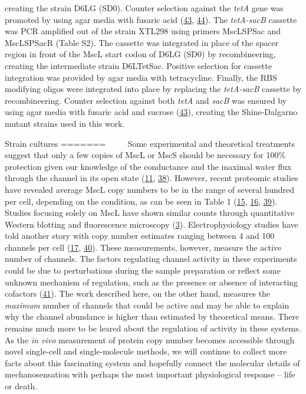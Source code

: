 creating
the
strain
D6LG
(SD0).
Counter
selection
against
the
\emph{tetA}
gene
was
promoted
by
using
agar
media
with
fusaric
acid
(\protect\hyperlink{ref-li2013}{43},
\protect\hyperlink{ref-bochner1980}{44}).
The
\emph{tetA-sacB}
cassette
was
PCR
amplified
out of
the
strain
XTL298
using
primers
MscLSPSac
and
MscLSPSacR
(Table
S2).
The
cassette
was
integrated
in
place
of the
spacer
region
in
front
of the
MscL
start
codon
of
D6LG
(SD0)
by
recombineering,
creating
the
intermediate
strain
D6LTetSac.
Positive
selection
for
cassette
integration
was
provided
by
agar
media
with
tetracycline.
Finally,
the
RBS
modifying
oligos
were
integrated
into
place
by
replacing
the
\emph{tetA-sacB}
cassette
by
recombineering.
Counter
selection
against
both
\emph{tetA}
and
\emph{sacB}
was
ensured
by
using
agar
media
with
fusaric
acid
and
sucrose
(\protect\hyperlink{ref-li2013}{43}),
creating
the
Shine-Dalgarno
mutant
strains
used
in
this
work.

Strain
cultures
=======
~~~~
Some
experimental
and
theoretical
treatments
suggest
that
only a
few
copies
of
MscL
or
MscS
should
be
necessary
for
100\%
protection
given
our
knowledge
of the
conductance
and
the
maximal
water
flux
through
the
channel
in its
open
state
(\protect\hyperlink{ref-louhivuori2010}{11},
\protect\hyperlink{ref-booth2014}{38}).
However,
recent
proteomic
studies
have
revealed
average
MscL
copy
numbers
to be
in the
range
of
several
hundred
per
cell,
depending
on the
condition,
as can
be
seen
in
Table
1
(\protect\hyperlink{ref-schmidt2016}{15},
\protect\hyperlink{ref-soufi2015}{16},
\protect\hyperlink{ref-li2014}{39}).
Studies
focusing
solely
on
MscL
have
shown
similar
counts
through
quantitative
Western
blotting
and
fluorescence
microscopy
(\protect\hyperlink{ref-bialecka-fornal2012}{3}).
Electrophysiology
studies
have
told
another
story
with
copy
number
estimates
ranging
between
4 and
100
channels
per
cell
(\protect\hyperlink{ref-stokes2003a}{17},
\protect\hyperlink{ref-blount1999}{40}).
These
measurements,
however,
measure
the
active
number
of
channels.
The
factors
regulating
channel
activity
in
these
experiments
could
be due
to
perturbations
during
the
sample
preparation
or
reflect
some
unknown
mechanism
of
regulation,
such
as the
presence
or
absence
of
interacting
cofactors
(\protect\hyperlink{ref-schumann2010}{41}).
The
work
described
here,
on the
other
hand,
measures
the
\emph{maximum}
number
of
channels
that
could
be
active
and
may be
able
to
explain
why
the
channel
abundance
is
higher
than
estimated
by
theoretical
means.
There
remains
much
more
to be
leared
about
the
regulation
of
activity
in
these
systems.
As the
\emph{in
vivo}
measurement
of
protein
copy
number
becomes
accessible
through
novel
single-cell
and
single-molecule
methods,
we
will
continue
to
collect
more
facts
about
this
fascinating
system
and
hopefully
connect
the
molecular
details
of
mechanosensation
with
perhaps
the
most
important
physiological
response
--
life
or
death.

